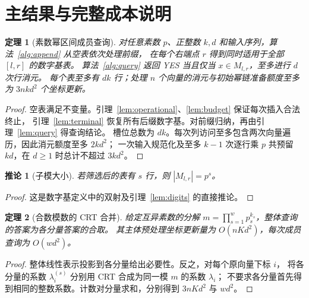 \documentclass[11pt,a4paper,fontset=fandol]{ctexart}
\theoremstyle{definition}
\theoremstyle{plain}
\newtheorem{theorem}{定理}
\newtheorem{corollary}{推论}
\begin{document}
\section{主结果与完整成本说明}
\begin{theorem}[素数幂区间成员查询]\label{thm:prime}
对任意素数 $p$、正整数 $k,d$ 和输入序列，算法~\ref{alg:append} 从空表依次处理前缀，
在每个右端点 $r$ 得到同时适用于全部 $[l,r]$ 的数字基表。
算法~\ref{alg:query} 返回 YES 当且仅当 $x\in M_{l,r}$，至多进行 $d$ 次行消元。
每个表至多有 $dk$ 行；处理 $n$ 个向量的消元与初始幂链准备额度至多为 $3nkd^2$ 个坐标更新。
\end{theorem}
\begin{proof}
空表满足不变量。引理~\ref{lem:operational}、\ref{lem:budget} 保证每次插入合法终止，
引理~\ref{lem:terminal} 恢复所有后缀数字基。对前缀归纳，再由引理~\ref{lem:query} 得查询结论。
槽位总数为 $dk$。每次列访问至多包含两次向量遍历，因此消元额度至多 $2kd^2$；
一次输入规范化及至多 $k-1$ 次逐行乘 $p$ 共预留 $kd$，在 $d\ge1$ 时总计不超过 $3kd^2$。
\end{proof}

\begin{corollary}[子模大小]\label{cor:card}
若筛选后的表有 $s$ 行，则 $|M_{l,r}|=p^s$。
\end{corollary}
\begin{proof}
这是数字基定义中的双射及引理~\ref{lem:digits} 的直接推论。
\end{proof}

\begin{theorem}[合数模数的 CRT 合并]\label{thm:crt}
给定互异素数的分解 $m=\prod_{s=1}^w p_s^{k_s}$，整体查询的答案为各分量答案的合取。
其主体预处理坐标更新量为 $O(nKd^2)$，每次成员查询为 $O(wd^2)$。
\end{theorem}
\begin{proof}
整体线性表示投影到各分量给出必要性。反之，对每个原向量下标 $i$，
将各分量的系数 $\lambda_i^{(s)}$ 分别用 CRT 合成为同一模 $m$ 的系数 $\lambda_i$；
不要求各分量首先得到相同的整数系数。计数对分量求和，分别得到 $3nKd^2$ 与 $wd^2$。
\end{proof}
\end{document}
